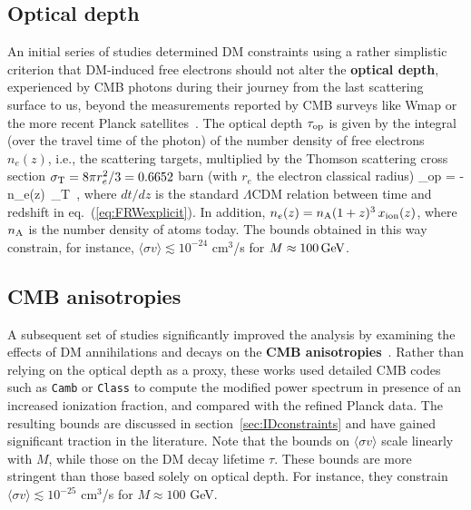 \subsection{Optical depth}\label{sec:cosmoconstraintsCMBTau}
An initial series of studies determined DM constraints using a rather simplistic criterion that DM-induced free electrons should not alter the \textbf{optical depth}, experienced by CMB photons during their journey from the last scattering surface to us, beyond the measurements reported by CMB surveys like {\sc Wmap} or the more recent {\sc Planck} satellites~\cite{reionbounds}.
The optical depth
$\tau_{\rm op}$ is given by the integral (over the travel time of the photon) of the number density of free electrons $n_e(z)$, i.e., the scattering targets, multiplied by the Thomson scattering cross section $\sigma_{\rm T} = 8 \pi r_e^2/3 = 0.6652$ barn (with $r_e$ the electron classical radius) 
\beq
\tau_{\rm op} = - \int n_e(z)\, \sigma_{\rm T}\, ,
\eeq
where $dt/dz$ is the standard $\Lambda$CDM relation between time and redshift in eq.~(\ref{eq:FRWexplicit}). In addition, $n_e(z) = n_{\rm A} (1+z)^3 \, x_{\rm ion}(z)$, where $n_{\rm A}$ is the number density of atoms today. The bounds obtained in this way constrain, for instance, $\langle \sigma v \rangle \lesssim 10^{-24}$ cm$^3$/s for $M \approx 100\,{\rm GeV}$.


\subsection{CMB anisotropies}
\label{sec:CMBconstraints}
\label{sec:cosmoconstraintsCMB}
A subsequent set of studies significantly improved the analysis by examining the effects of DM annihilations and decays on the  {\bf CMB anisotropies}~\cite{CMBbounds}. 
Rather than relying on the optical depth as a proxy, these works used detailed CMB codes such as {\tt Camb} or {\tt Class} to compute the modified power spectrum in presence of an increased ionization fraction, and compared with the refined {\sc Planck} data. 
The resulting bounds are discussed in section~\ref{sec:IDconstraints} and have gained significant traction in the literature. 
Note that the bounds on $\langle \sigma v \rangle$ scale linearly with $M$, while those on the DM decay 
lifetime 
$\tau$. 
These bounds are more stringent than those based solely on optical depth. For instance, they constrain $\langle \sigma v \rangle \lesssim 10^{-25}$ cm$^3$/s for $M \approx 100$ GeV.

\medskip

